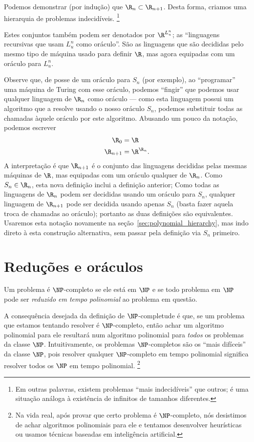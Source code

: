 Podemos demonstrar (por indução) que $\R_n \subset \R_{n+1}$.
Desta forma,
criamos uma hierarquia de problemas indecidíveis.%
\footnote{
    Em outras palavras,
    existem problemas ``mais indecidíveis'' que outros;
    é uma situação análoga à existência de infinitos de tamanhos diferentes.
}

Estes conjuntos também podem ser denotados por $\R^{L_u^n}$;
as ``linguagens recursivas que usam $L_u^n$ como oráculo''.
São as linguagens que são decididas
pelo mesmo tipo de máquina usado para definir $\R$,
mas agora equipadas com um oráculo para $L_u^n$.

Observe que,
de posse de um oráculo para $S_n$ (por exemplo),
ao ``programar'' uma máquina de Turing com esse oráculo,
podemos ``fingir'' que podemos usar qualquer linguagem de $\R_n$ como oráculo
--- como esta linguagem possui um algoritmo que a resolve
usando o nosso oráculo $S_n$,
podemos substituir todas as chamadas àquele oráculo
por este algoritmo.
Abusando um pouco da notação,
podemos escrever
\begin{equation}
    \begin{aligned}
        \R_0 &= \R \\
        \R_{n+1} &= \R^{\R_n}.
    \end{aligned}
    \label{eq:oracle_notation_abuse}
\end{equation}
A interpretação é que $\R_{n+1}$ é o conjunto das linguagens
decididas pelas mesmas máquinas de $\R$,
mas equipadas com um oráculo qualquer de $\R_n$.
Como $S_n \in \R_n$, esta nova definição inclui a definição anterior;
Como todas as linguagens de $\R_n$ podem ser decididas usando um oráculo para $S_n$,
qualquer linguagem de $\R_{n+1}$
pode ser decidida usando apenas $S_n$
(basta fazer aquela troca de chamadas ao oráculo);
portanto as duas definições são equivalentes.
Usaremos esta notação novamente na seção~\ref{sec:polynomial_hierarchy},
mas indo direto à esta construção alternativa,
sem passar pela definição via $S_n$ primeiro.

\section{Reduções e oráculos}

Um problema é $\NP$-completo se
ele está em $\NP$
e se todo problema em $\NP$ pode ser \emph{reduzido em tempo polinomial}
ao problema em questão.

A consequência desejada da definição de $\NP$-completude é que,
se um problema que estamos tentando resolver é $\NP$-completo,
então achar um algoritmo polinomial para ele
resultará num algoritmo polinomial para \emph{todos} os problemas da classe $\NP$.
Intuitivamente,
os problemas $\NP$-completos são os ``mais difíceis'' da classe $\NP$,
pois resolver qualquer $\NP$-completo em tempo polinomial
significa resolver todos os $\NP$ em tempo polinomial.%
\footnote{
    Na vida real,
    após provar que certo problema é $\NP$-completo,
    nós desistimos de achar algoritmos polinomiais para ele
    e tentamos desenvolver heurísticas
    ou usamos técnicas baseadas em inteligência artificial.
}

